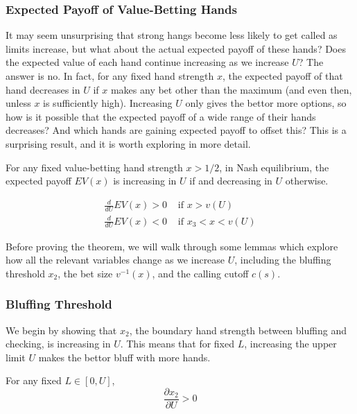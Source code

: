 \documentclass[../../main/main.tex]{subfiles}
\begin{document}
\subsubsection{Expected Payoff of Value-Betting Hands}

It may seem unsurprising that strong hangs become less likely to get called as limits increase, but what about the actual expected payoff of these hands? Does the expected value of each hand continue increasing as we increase $U$? The answer is no. In fact, for any fixed hand strength $x$, the expected payoff of that hand decreases in $U$ if $x$ makes any bet other than the maximum (and even then, unless $x$ is sufficiently high). Increasing $U$ only gives the bettor more options, so how is it possible that the expected payoff of a wide range of their hands decreases? And which hands are gaining expected payoff to offset this? This is a surprising result, and it is worth exploring in more detail.

\begin{theorem}
    \label{thm:payoff_increasing}
    For any fixed value-betting hand strength $x>1/2$, in Nash equilibrium, the expected payoff $EV(x)$ is increasing in $U$ if  and decreasing in $U$ otherwise.

    \begin{align*}
        \frac{d}{dU} EV(x) > 0 & \text{ if } x > v(U) \\ 
        \frac{d}{dU} EV(x) < 0 & \text{ if } x_3 < x < v(U) 
    \end{align*}
\end{theorem}

Before proving the theorem, we will walk through some lemmas which explore how all the relevant variables change as we increase $U$, including the bluffing threshold $x_2$, the bet size $v^{-1}(x)$, and the calling cutoff $c(s)$.

\subsubsection{Bluffing Threshold}

We begin by showing that $x_2$, the boundary hand strength between bluffing and checking, is increasing in $U$. This means that for fixed $L$, increasing the upper limit $U$ makes the bettor bluff with more hands. 

\begin{lemma}
    \label{lem:x2_increasing}
    For any fixed $L \in [0, U]$,
    $$ \frac{\partial x_2}{\partial U} > 0 $$
\end{lemma}
\end{document}
